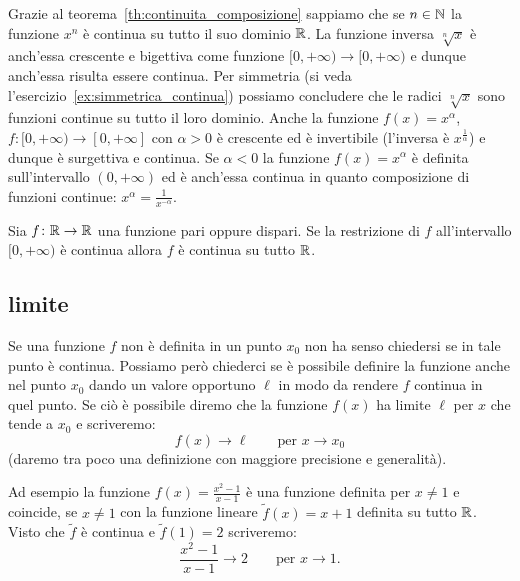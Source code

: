 Grazie al teorema~\ref{th:continuita_composizione} sappiamo 
che se $n\in {\mathbb N}$ la funzione $x^n$ è continua su tutto il suo 
dominio ${\mathbb R}$. 
La funzione inversa $\sqrt[n]{x}$ è anch'essa crescente e 
bigettiva come funzione $[0,+\infty)\to[0,+\infty)$ e dunque 
anch'essa risulta essere continua.
Per simmetria (si veda l'esercizio~\ref{ex:simmetrica_continua}) 
possiamo concludere 
che le radici $\sqrt[n]{x}$ sono 
funzioni continue su tutto il loro dominio.
Anche la funzione $f(x) = x^\alpha$, $f\colon [0,+\infty)\to [0,+\infty]$ 
con $\alpha>0$ è crescente ed è invertibile (l'inversa è $x^{\frac 1 \alpha}$)
e dunque è surgettiva e continua.
Se $\alpha<0$ la funzione $f(x)=x^\alpha$ è definita sull'intervallo 
$(0,+\infty)$ ed è anch'essa continua in quanto 
composizione di funzioni continue: $x^{\alpha} = \frac{1}{x^{-\alpha}}$.

%
\begin{exercise}\label{ex:simmetrica_continua}
  Sia $f\colon {\mathbb R}\to {\mathbb R}$ una funzione pari oppure dispari.
  Se la restrizione di $f$ all'intervallo $[0,+\infty)$ 
  è continua allora $f$ è continua su tutto ${\mathbb R}$.
\end{exercise}

\subsection{limite}

Se una funzione $f$ non è definita in un punto $x_0$ non ha senso chiedersi
se in tale punto è continua. 
Possiamo però chiederci se è possibile definire la funzione anche nel punto 
$x_0$ dando un valore opportuno $\ell$ in modo da rendere $f$ continua 
in quel punto. 
Se ciò è possibile diremo che la funzione $f(x)$ ha limite $\ell$ 
per $x$ che tende a $x_0$ e scriveremo:
\[
  f(x) \to \ell \qquad \text{per $x\to x_0$}
\]
(daremo tra poco una definizione con maggiore precisione e generalità).

Ad esempio la funzione $f(x) = \frac{x^2-1}{x-1}$ è una funzione definita per $x\neq 1$
e coincide, se $x\neq 1$ con la funzione lineare $\tilde f(x) = x+1$ definita 
su tutto ${\mathbb R}$. 
Visto che $\tilde f$ è continua e $\tilde f(1)=2$
scriveremo:
\[
  \frac{x^2-1}{x-1} \to 2
  \qquad \text{per $x\to 1$.}
\]

